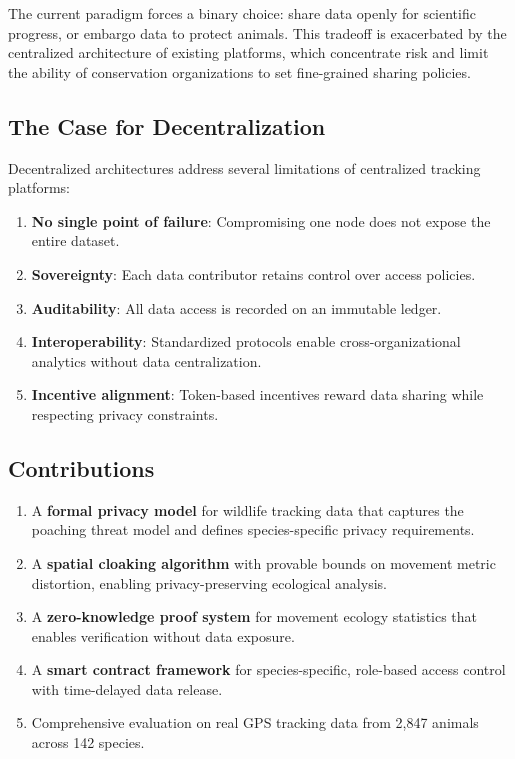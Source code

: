 \documentclass[11pt,letterpaper]{article}
\begin{document}
The current paradigm forces a binary choice: share data openly for scientific progress, or embargo data to protect animals. This tradeoff is exacerbated by the centralized architecture of existing platforms, which concentrate risk and limit the ability of conservation organizations to set fine-grained sharing policies.

\subsection{The Case for Decentralization}

Decentralized architectures address several limitations of centralized tracking platforms:

\begin{enumerate}[leftmargin=*]
    \item \textbf{No single point of failure}: Compromising one node does not expose the entire dataset.
    \item \textbf{Sovereignty}: Each data contributor retains control over access policies.
    \item \textbf{Auditability}: All data access is recorded on an immutable ledger.
    \item \textbf{Interoperability}: Standardized protocols enable cross-organizational analytics without data centralization.
    \item \textbf{Incentive alignment}: Token-based incentives reward data sharing while respecting privacy constraints.
\end{enumerate}

\subsection{Contributions}

\begin{enumerate}[leftmargin=*]
    \item A \textbf{formal privacy model} for wildlife tracking data that captures the poaching threat model and defines species-specific privacy requirements.
    \item A \textbf{spatial cloaking algorithm} with provable bounds on movement metric distortion, enabling privacy-preserving ecological analysis.
    \item A \textbf{zero-knowledge proof system} for movement ecology statistics that enables verification without data exposure.
    \item A \textbf{smart contract framework} for species-specific, role-based access control with time-delayed data release.
    \item Comprehensive evaluation on real GPS tracking data from 2,847 animals across 142 species.
\end{enumerate}
\end{document}
